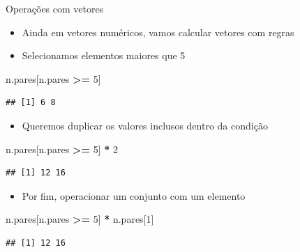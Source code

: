 \documentclass[
  10pt,
  ignorenonframetext,
]{beamer}
\newenvironment{Shaded}{\begin{snugshade}}{\end{snugshade}}
\newcommand{\DecValTok}[1]{\textcolor[rgb]{0.00,0.00,0.81}{#1}}
\newcommand{\NormalTok}[1]{#1}
\newcommand{\OperatorTok}[1]{\textcolor[rgb]{0.81,0.36,0.00}{\textbf{#1}}}
\newcommand{\StringTok}[1]{\textcolor[rgb]{0.31,0.60,0.02}{#1}}
\providecommand{\tightlist}{%
  \setlength{\itemsep}{0pt}\setlength{\parskip}{0pt}}
\begin{document}
\begin{frame}[fragile]{Operações com vetores}
\protect\hypertarget{operauxe7uxf5es-com-vetores-1}{}
\begin{itemize}
\tightlist
\item
  Ainda em vetores numéricos, vamos calcular vetores com regras
\item
  Selecionamos elementos maiores que 5
\end{itemize}

\begin{Shaded}
\begin{Highlighting}[]
\NormalTok{n.pares[n.pares }\OperatorTok{\textgreater{}=}\StringTok{ }\DecValTok{5}\NormalTok{]}
\end{Highlighting}
\end{Shaded}

\begin{verbatim}
## [1] 6 8
\end{verbatim}

\begin{itemize}
\tightlist
\item
  Queremos duplicar os valores inclusos dentro da condição
\end{itemize}

\begin{Shaded}
\begin{Highlighting}[]
\NormalTok{n.pares[n.pares }\OperatorTok{\textgreater{}=}\StringTok{ }\DecValTok{5}\NormalTok{] }\OperatorTok{*}\StringTok{ }\DecValTok{2}
\end{Highlighting}
\end{Shaded}

\begin{verbatim}
## [1] 12 16
\end{verbatim}

\begin{itemize}
\tightlist
\item
  Por fim, operacionar um conjunto com um elemento
\end{itemize}

\begin{Shaded}
\begin{Highlighting}[]
\NormalTok{n.pares[n.pares }\OperatorTok{\textgreater{}=}\StringTok{ }\DecValTok{5}\NormalTok{] }\OperatorTok{*}\StringTok{ }\NormalTok{n.pares[}\DecValTok{1}\NormalTok{]}
\end{Highlighting}
\end{Shaded}

\begin{verbatim}
## [1] 12 16
\end{verbatim}
\end{frame}
\end{document}
